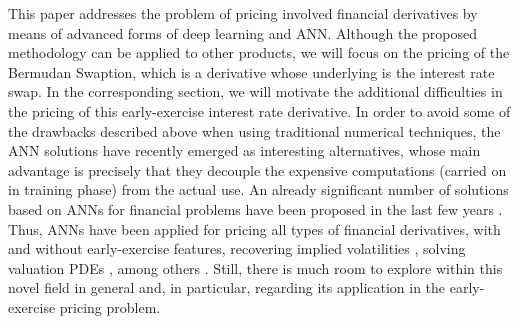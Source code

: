     This paper addresses the problem of pricing involved financial derivatives by means of advanced forms of deep learning and ANN. Although the proposed methodology can be applied to other products, we will focus on the pricing of the Bermudan Swaption, which is a derivative whose underlying is the interest rate swap. In the corresponding section, we will motivate the additional difficulties in the pricing of this early-exercise interest rate derivative. In order to avoid some of the drawbacks described above when using traditional numerical techniques, the ANN solutions have recently emerged as interesting alternatives, whose main advantage is precisely that they decouple the expensive computations (carried on in training phase) from the actual use. An already significant number of solutions based on ANNs for financial problems have been proposed in the last few years \cite{kumar2023}. Thus, ANNs have been applied for pricing all types of financial derivatives, with \cite{becker2020, huge2020} and without \cite{liu2019} early-exercise features, recovering implied volatilities \cite{horvath2021, liu2021}, solving valuation PDEs \cite{salvador2021, villarino2023}, among others \cite{gnoatto2023}. Still, there is much room to explore within this novel field in general and, in particular, regarding its application in the early-exercise pricing problem.
    
